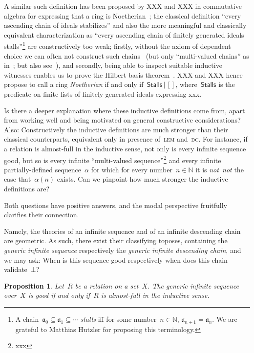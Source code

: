 \documentclass[oneside,reqno]{amsart}
\theoremstyle{definition}
\theoremstyle{plain}
\newtheorem{prop}[defn]{Proposition}
\theoremstyle{remark}
\newcommand{\aaa}{\mathfrak{a}}
\newcommand{\NN}{\mathbb{N}}
\renewcommand{\_}{\mathpunct{.}\,}
\newcommand{\notnot}{\emph{not~not}\xspace}
\newcommand{\?}{\,{:}\,}
\begin{document}
A similar such definition has been proposed by XXX and XXX in commutative
algebra for expressing that a ring is Noetherian~\cite{xxx}; the classical
definition ``every ascending chain of ideals stabilizes'' and also the more
meaningful and classically equivalent characterization as ``every ascending
chain of finitely generated ideals stalls''\footnote{A chain~$\aaa_0 \subseteq
\aaa_1 \subseteq \cdots$ \emph{stalls} iff for some number~$n \in \NN$,
$\aaa_{n+1} = \aaa_n$. We are grateful to Matthias Hutzler for proposing this
terminology.} are constructively too weak; firstly, without the axiom of
dependent choice we can often not construct such chains~\cite{richman:xxx} (but only
``multi-valued chains'' as in~\cite[Section~3.9]{blechschmidt:phd}; but also
see~\cite{richman:xxx}), and secondly, being able to inspect suitable inductive
witnesses enables us to prove the Hilbert basis theorem~\cite{xxx}. XXX and XXX
hence propose to call a ring \emph{Noetherian} if and only if~$\mathsf{Stalls}
\,|\, []$, where~$\mathsf{Stalls}$ is the predicate on finite lists of finitely
generated ideals expressing xxx.

Is there a deeper explanation where these inductive definitions come from,
apart from working well and being motivated on general constructive
considerations? Also: Constructively the inductive definitions are much
stronger than their classical counterparts, equivalent only in presence
of~\textsc{lem} and~\textsc{dc}. For instance, if a relation is almost-full in
the inductive sense, not only is every infinite sequence good, but so is every
infinite ``multi-valued sequence''\footnote{xxx} and every infinite
partially-defined sequence~$\alpha$ for which for every number~$n \in \NN$ it
is \notnot the case that~$\alpha(n)$ exists. Can we pinpoint how much stronger
the inductive definitions are?

Both questions have positive answers, and the modal
perspective fruitfully clarifies their connection.

Namely, the theories of an infinite sequence and of an infinite descending chain
are geometric. As such, there exist their classifying toposes, containing the
\emph{generic infinite sequence} respectively the \emph{generic infinite
descending chain}, and we may ask: When is this sequence good respectively when
does this chain validate~$\bot$?

\begin{prop}\label{prop:gen-good}Let~$R$ be a relation on a set~$X$. The
generic infinite sequence over~$X$ is good if and only if~$R$ is almost-full in
the inductive sense.\end{prop}
\end{document}
